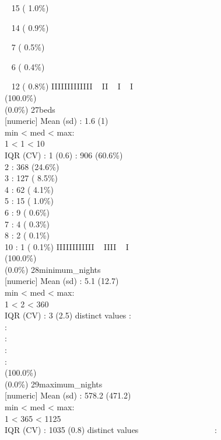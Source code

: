 \documentclass[
  journal,
]{IEEEtran}%
\begin{document}
\strut ~ 15 ( 1.0\%)\\
\strut ~ 14 ( 0.9\%)\\
\strut ~ 7 ( 0.5\%)\\
\strut ~ 6 ( 0.4\%)\\
\strut ~ 12 ( 0.8\%) \textbar{} \textbar IIIIIIIIIIIII ~ II ~ I ~ I ~ ~
~ ~ ~ ~ ~ \\
(100.0\%) \\
(0.0\%) \textbar{} \textbar{} 27\textbar beds\\
{[}numeric{]} \textbar Mean (sd) : 1.6 (1)\\
min \textless{} med \textless{} max:\\
1 \textless{} 1 \textless{} 10\\
IQR (CV) : 1 (0.6)  : 906 (60.6\%)\\
2 : 368 (24.6\%)\\
3 : 127 ( 8.5\%)\\
4 : 62 ( 4.1\%)\\
5 : 15 ( 1.0\%)\\
6 : 9 ( 0.6\%)\\
7 : 4 ( 0.3\%)\\
8 : 2 ( 0.1\%)\\
10 : 1 ( 0.1\%) \textbar{} \textbar IIIIIIIIIIII ~ IIII ~ I ~ ~ ~ ~ ~ ~
\\
(100.0\%) \\
(0.0\%) \textbar{} \textbar{} 28\textbar minimum\_nights\\
{[}numeric{]} \textbar Mean (sd) : 5.1 (12.7)\\
min \textless{} med \textless{} max:\\
1 \textless{} 2 \textless{} 360\\
IQR (CV) : 3 (2.5)  distinct values \textbar{} \textbar:\\
:\\
:\\
:\\
: \\
(100.0\%) \\
(0.0\%) \textbar{} \textbar{} 29\textbar maximum\_nights\\
{[}numeric{]} \textbar Mean (sd) : 578.2 (471.2)\\
min \textless{} med \textless{} max:\\
1 \textless{} 365 \textless{} 1125\\
IQR (CV) : 1035 (0.8)  distinct values \textbar{}
\textbar~~~~~~~~~~~~~~~~~~:\\
\end{document}
